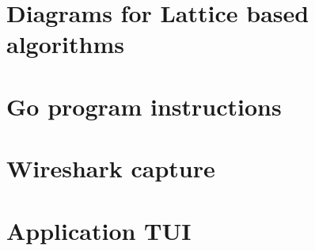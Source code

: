 \chapter{Diagrams for Lattice based algorithms}
\label{ch:block_diagrams}


\chapter{Go program instructions}
\label{ch:go_instructions}


\chapter{Wireshark capture}
\label{ch:wireshark}


\chapter{Application TUI}
\label{ch:TUI_example}

